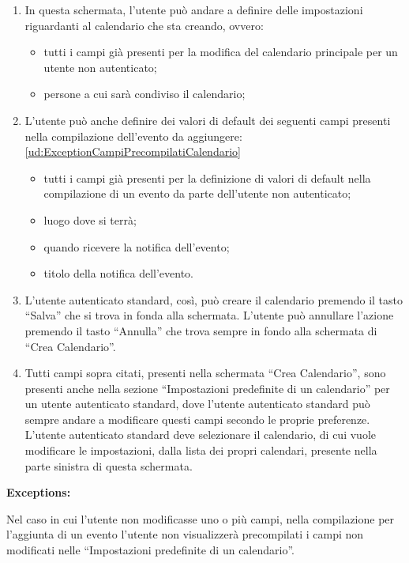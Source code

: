 \begin{listaPersonale}[UC]{}
\begin{enumerate}
        \item In questa schermata, l'utente può andare a definire delle impostazioni riguardanti al calendario che sta creando, ovvero:
              \begin{itemize}
                  \item tutti i campi già presenti per la modifica del calendario principale per un utente non autenticato;
                  \item persone a cui sarà condiviso il calendario;
              \end{itemize}
        \item L'utente  può anche definire dei valori di default dei seguenti campi presenti nella compilazione dell'evento da aggiungere: \ref{ud:ExceptionCampiPrecompilatiCalendario}
              \begin{itemize}
                  \item tutti i campi già presenti per la definizione di valori di default nella compilazione di un evento da parte dell'utente non autenticato;
                  \item luogo dove si terrà;
                  \item quando ricevere la notifica dell'evento;
                  \item titolo della notifica dell'evento.
              \end{itemize}
        \item L'utente autenticato standard, così, può creare il calendario premendo il tasto “Salva” che si trova in fonda alla schermata. L'utente può annullare l'azione premendo il tasto “Annulla” che trova sempre in fondo alla schermata di “Crea Calendario”.
        \item Tutti campi sopra citati, presenti nella schermata “Crea Calendario”, sono presenti anche nella sezione “Impostazioni predefinite di un calendario” per un utente autenticato standard, dove l'utente autenticato standard può sempre andare a modificare questi campi secondo le proprie preferenze. L'utente autenticato standard deve selezionare il calendario, di cui vuole modificare le impostazioni, dalla lista dei propri calendari, presente nella parte sinistra di questa schermata.
    \end{enumerate}

    \textbf{Exceptions:}
    \begin{enumerate}[label=\textbf{[exception \arabic{enumii}]}, ref= \textbf{[exception \arabic{enumii}]}]
         Nel caso in cui l'utente non modificasse uno o più campi, nella compilazione per l'aggiunta di un evento l'utente non visualizzerà precompilati i campi non modificati nelle “Impostazioni predefinite di un calendario”.
    \end{enumerate}






\end{listaPersonale}
